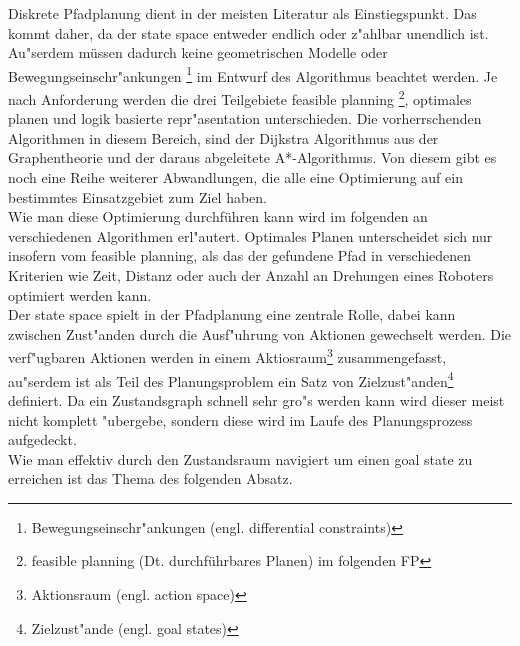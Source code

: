 Diskrete Pfadplanung dient in der meisten Literatur als Einstiegspunkt. Das kommt daher, da der state space entweder endlich oder z"ahlbar unendlich ist.\\
Au"serdem müssen dadurch keine geometrischen Modelle oder Bewegungseinschr"ankungen \footnote{Bewegungseinschr"ankungen (engl. differential constraints)} im Entwurf des Algorithmus beachtet werden.
Je nach Anforderung werden die drei Teilgebiete feasible planning \footnote{feasible planning (Dt. durchführbares Planen) im folgenden FP}, optimales planen und logik basierte repr"asentation unterschieden. Die vorherrschenden Algorithmen in diesem Bereich, sind der Dijkstra Algorithmus aus der Graphentheorie und der daraus abgeleitete A*-Algorithmus. Von diesem gibt es noch eine Reihe weiterer Abwandlungen, die alle eine Optimierung auf ein bestimmtes Einsatzgebiet zum Ziel haben.\cite[~S. 27]{Lav06} \\
Wie man diese Optimierung durchführen kann wird im folgenden an verschiedenen Algorithmen erl"autert. Optimales Planen unterscheidet sich nur insofern vom feasible planning, als das der gefundene Pfad in verschiedenen Kriterien wie Zeit, Distanz oder auch der Anzahl an Drehungen eines Roboters optimiert werden kann.\cite[~S. 43]{Lav06} \\
Der state space spielt in der Pfadplanung eine zentrale Rolle, dabei kann zwischen Zust"anden durch die Ausf"uhrung von Aktionen gewechselt werden. Die verf"ugbaren Aktionen werden in einem Aktiosraum\footnote{Aktionsraum (engl. action space) } zusammengefasst, au"serdem ist als Teil des Planungsproblem ein Satz von Zielzust"anden\footnote{Zielzust"ande (engl. goal states)} definiert. 
Da ein Zustandsgraph schnell sehr gro"s werden kann wird dieser meist nicht komplett "ubergebe, sondern diese wird im Laufe des Planungsprozess aufgedeckt.
\cite[~S. 43]{Lav06} \\
Wie man effektiv durch den Zustandsraum navigiert um einen goal state zu erreichen ist das Thema des folgenden Absatz.

